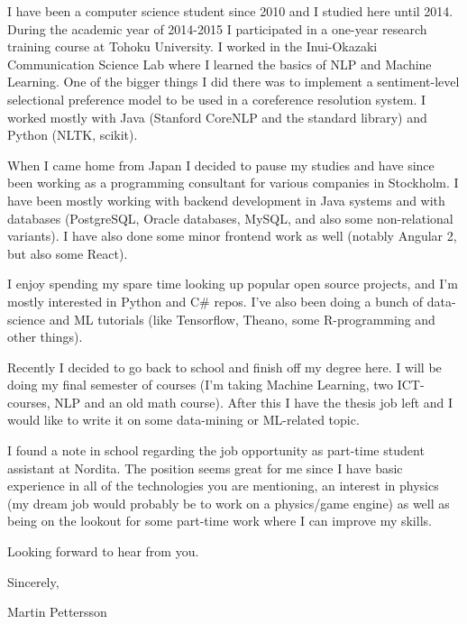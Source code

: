 \documentclass[11pt,stdletter,orderfromtodate,sigleft]{newlfm}
\begin{document}
\begin{newlfm}
I have been a computer science student since 2010 and I studied here until 2014. During the academic year of 2014-2015 I participated in a one-year research training course at Tohoku University. I worked in the Inui-Okazaki Communication Science Lab where I learned the basics of NLP and Machine Learning. One of the bigger things I did there was to implement a sentiment-level selectional preference model to be used in a coreference resolution system. I worked mostly with Java (Stanford CoreNLP and the standard library) and Python (NLTK, scikit).

When I came home from Japan I decided to pause my studies and have since been working as a programming consultant for various companies in Stockholm. I have been mostly working with backend development in Java systems and with databases (PostgreSQL, Oracle databases, MySQL, and also some non-relational variants). I have also done some minor frontend work as well (notably Angular 2, but also some React).

I enjoy spending my spare time looking up popular open source projects, and I'm mostly interested in Python and C\# repos. I've also been doing a bunch of data-science and ML tutorials (like Tensorflow, Theano, some R-programming and other things).

Recently I decided to go back to school and finish off my degree here. I will be doing my final semester of courses (I'm taking Machine Learning, two ICT-courses, NLP and an old math course). After this I have the thesis job left and I would like to write it on some data-mining or ML-related topic.
 
I found a note in school regarding the job opportunity as part-time student assistant at Nordita. The position seems great for me since I have basic experience in all of the technologies you are mentioning, an interest in physics (my dream job would probably be to work on a physics/game engine) as well as being on the lookout for some part-time work where I can improve my skills.

Looking forward to hear from you.

Sincerely,

Martin Pettersson
\end{newlfm}
\end{document}
